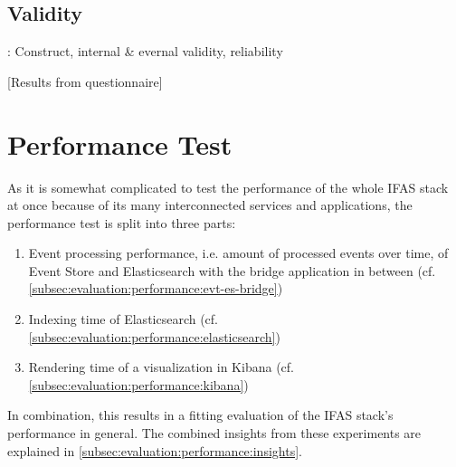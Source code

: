 

\subsection{Validity}
\label{subec:evaluation:user:validity}

\cite{Easterbrook2008a}: Construct, internal \& evernal validity, reliability

[Results from questionnaire]

\section{Performance Test}
\label{sec:evaluation:performance}

As it is somewhat complicated to test the performance of the whole \ac{IFAS} stack at once because of its many interconnected services and applications, the performance test is split into three parts:

\begin{enumerate}
\item Event processing performance, i.e. amount of processed events over time, of Event Store and Elasticsearch with the bridge application in between (cf. \cref{subsec:evaluation:performance:evt-es-bridge})
\item Indexing time of Elasticsearch (cf. \cref{subsec:evaluation:performance:elasticsearch})
\item Rendering time of a visualization in Kibana (cf. \cref{subsec:evaluation:performance:kibana})
\end{enumerate}

In combination, this results in a fitting evaluation of the \ac{IFAS} stack's performance in general.
The combined insights from these experiments are explained in \cref{subsec:evaluation:performance:insights}.

